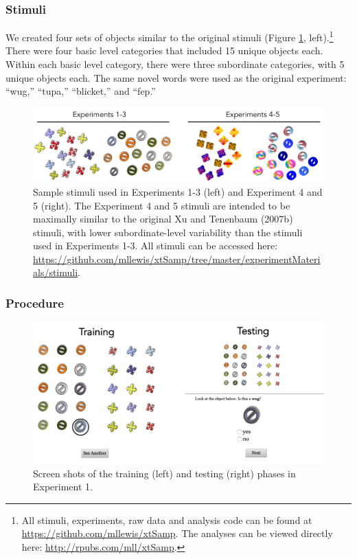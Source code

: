 \documentclass[man]{apa2}
\begin{document}
\subsubsection{Stimuli}
We created four sets of objects similar to the original stimuli (Figure \ref{fig:stims}, left).\footnote{All stimuli, experiments, raw data and analysis code can be found at \url{https://github.com/mllewis/xtSamp}. The analyses can be viewed directly here: \url{http://rpubs.com/mll/xtSamp}.} There were four basic level categories that included 15 unique objects each. Within each basic level category, there were three subordinate categories, with 5 unique objects each. The same novel words were used as the original experiment: ``wug,'' ``tupa,'' ``blicket,'' and ``fep.''
\begin{figure}[t]
 \begin{center} 
 \includegraphics[width=5in]{figures/stims.png} 
 \caption{ \label{fig:stims} Sample stimuli used in Experiments 1-3 (left) and Experiment 4 and 5 (right). The Experiment 4 and 5 stimuli are intended to be maximally similar to the original Xu and Tenenbaum (2007b) stimuli, with lower subordinate-level variability than the stimuli used in Experiments 1-3. All stimuli can be accessed here: \url{https://github.com/mllewis/xtSamp/tree/master/experimentMaterials/stimuli}. } 
 \end{center} 
\end{figure}	
 
\subsubsection{Procedure}
 \begin{figure} [t]
 \begin{center} 
 \includegraphics[width=5.5in]{figures/screen.png} 
 \caption{\label{fig:screen} Screen shots of the training (left) and testing (right) phases in Experiment 1. } 
 \end{center} 
\end{figure}
\end{document}

